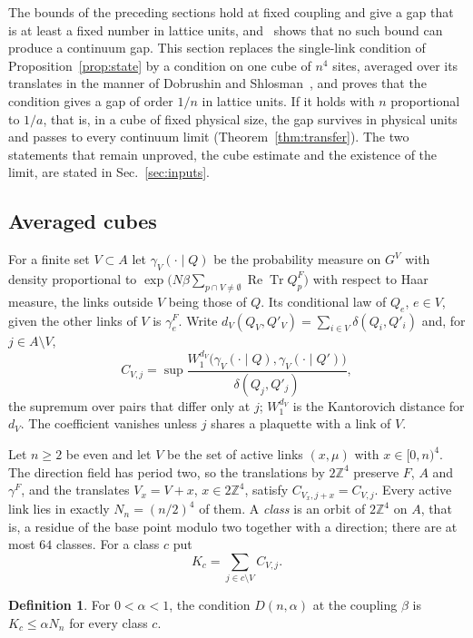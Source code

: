 \documentclass[aps,prd,twocolumn,superscriptaddress,nofootinbib,longbibliography,floatfix,amsmath,amssymb,10pt]{revtex4-2}
\theoremstyle{definition}
\newtheorem{definition}[theorem]{Definition}
\theoremstyle{remark}
\newcommand{\Z}{\mathbb{Z}}
\newcommand{\ReTr}{\operatorname{Re}\operatorname{Tr}}
\begin{document}
The bounds of the preceding sections hold at fixed coupling and give a gap
that is at least a fixed number in lattice units, and~\cite{BB26b} shows that
no such bound can produce a continuum gap. This section replaces the
single-link condition of Proposition~\ref{prop:state} by a condition on one
cube of $n^4$ sites, averaged over its translates in the manner of Dobrushin
and Shlosman~\cite{DS85}, and proves that the condition gives a gap of order
$1/n$ in lattice units. If it holds with $n$ proportional to $1/a$, that is,
in a cube of fixed physical size, the gap survives in physical units and
passes to every continuum limit (Theorem~\ref{thm:transfer}). The two
statements that remain unproved, the cube estimate and the existence of the
limit, are stated in Sec.~\ref{sec:inputs}.

\subsection{Averaged cubes}

For a finite set $V\subset A$ let $\gamma_V(\cdot\mid Q)$ be the probability
measure on $G^V$ with density proportional to $\exp\bigl(N\beta\sum_{p\cap
V\ne\emptyset}\ReTr Q^F_p\bigr)$ with respect to Haar measure, the links
outside $V$ being those of $Q$. Its conditional law of $Q_e$, $e\in V$, given
the other links of $V$ is $\gamma^F_e$. Write $d_V(Q_V,Q'_V)=\sum_{i\in V}
\delta(Q_i,Q'_i)$ and, for $j\in A\setminus V$,
\[
C_{V,j}=\sup\frac{W_1^{d_V}\bigl(\gamma_V(\cdot\mid Q),\gamma_V(\cdot\mid
Q')\bigr)}{\delta(Q_j,Q'_j)},
\]
the supremum over pairs that differ only at $j$; $W_1^{d_V}$ is the
Kantorovich distance for $d_V$. The coefficient vanishes unless $j$ shares a
plaquette with a link of $V$.

Let $n\ge2$ be even and let $V$ be the set of active links $(x,\mu)$ with
$x\in[0,n)^4$. The direction field has period two, so the translations by
$2\Z^4$ preserve $F$, $A$ and $\gamma^F$, and the translates $V_x=V+x$,
$x\in2\Z^4$, satisfy $C_{V_x,j+x}=C_{V,j}$. Every active link lies in exactly
$N_n=(n/2)^4$ of them. A \emph{class} is an orbit of $2\Z^4$ on $A$, that is,
a residue of the base point modulo two together with a direction; there are
at most $64$ classes. For a class $c$ put
\[
K_c=\sum_{j\in c\setminus V}C_{V,j}.
\]

\begin{definition}\label{def:cube}
For $0<\alpha<1$, the condition $D(n,\alpha)$ at the coupling $\beta$ is
$K_c\le\alpha N_n$ for every class $c$.
\end{definition}
\end{document}

